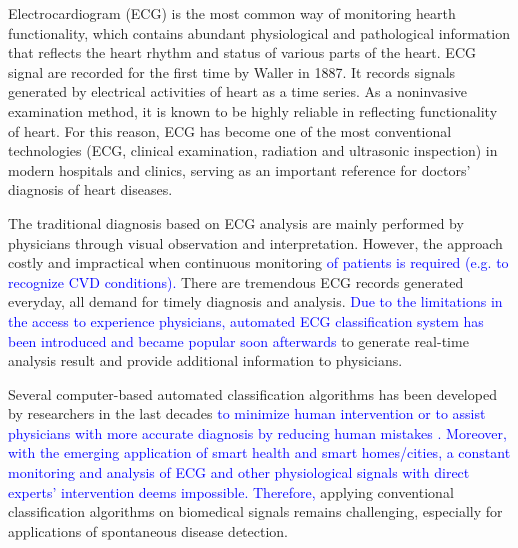 Electrocardiogram (ECG) is the most common way of monitoring hearth functionality, which %
contains abundant physiological and pathological information that reflects the heart rhythm and status of various parts of the heart. ECG signal are recorded for the first time by Waller in 1887\cite{besterman1979waller}. %
It records signals generated by electrical activities of heart as a time series. As a noninvasive examination method, it is known to be highly reliable in reflecting functionality of heart. For this reason, ECG has become one of the most conventional technologies (ECG, clinical examination, radiation and ultrasonic inspection) in modern hospitals and clinics, serving as an important reference for doctors' diagnosis of heart diseases.


The traditional diagnosis based on ECG analysis are mainly performed by physicians through visual observation and interpretation.%
However, the approach costly and impractical when continuous monitoring \textcolor{blue}{of patients is required (e.g. to recognize CVD conditions).}%
There are tremendous ECG records generated everyday, all demand for timely diagnosis and analysis. %
\textcolor{blue}{Due to the limitations in the access to experience physicians, automated  ECG classification system has been introduced and became popular soon afterwards} to generate real-time analysis result and provide additional information to physicians. 

Several computer-based automated classification algorithms has been developed by researchers in the last decades \textcolor{blue}{to minimize human intervention or to assist physicians with more accurate diagnosis by reducing human mistakes \cite{lagerholm2000clustering, prasad2003classification, autofs, ceylan2009novel, osowski2004support, Hu_et_al,deChazal2006,llamedo2012automatic,bbnn,ince2009generic,Kiranyaz}.} \textcolor{blue}{Moreover, with the emerging application of smart health and smart homes/cities, a constant monitoring and analysis of ECG and other physiological signals with direct experts' intervention deems impossible. Therefore,} applying conventional classification algorithms on biomedical signals remains challenging, especially for applications of spontaneous disease detection. 

